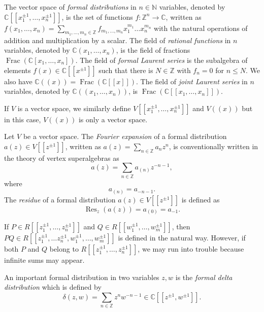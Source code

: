 \documentclass[a4paper, 12pt, reqno]{amsart}
\theoremstyle{remark}
\numberwithin{equation}{subsection}
\DeclareMathOperator{\Frac}{Frac}
\DeclareMathOperator{\Res}{Res}
\begin{document}
The vector space of \emph{formal distributions} in $n \in \mathbb{N}$ variables, denoted by $\mathbb{C}[[x_1^{\pm 1}, \dots, x_n^{\pm 1}]]$, is the set of functions $f: \mathbb{Z}^n \to \mathbb{C}$, written as $f(x_1, \dots, x_n) = \sum_{m_1, \dots, m_n \in \mathbb{Z}}f_{m_1, \dots, m_n}x_1^{m_1}\dots x_n^{m_n}$ with the natural operations of addition and multiplication by a scalar.
The field of \emph{rational functions} in $n$ variables, denoted by $\mathbb{C}(x_1, \dots, x_n)$, is the field of fractions $\Frac(\mathbb{C}[x_1, \dots, x_n])$.
The field of \emph{formal Laurent series} is the subalgebra of elements $f(x) \in \mathbb{C}[[x^{\pm 1}]]$ such that there is $N \in \mathbb{Z}$ with $f_n = 0$ for $n \le N$.
We also have $\mathbb{C}((x)) = \Frac(\mathbb{C}[[x]])$.
The field of \emph{joint Laurent series} in $n$ variables, denoted by $\mathbb{C}((x_1, \dots, x_n))$, is $\Frac(\mathbb{C}[[x_1, \dots, x_n]])$.

If $V$ is a vector space, we similarly define $V[[x_1^{\pm 1}, \dots, x_n^{\pm 1}]]$ and $V((x))$ but in this case, $V((x))$ is only a vector space.

Let $V$ be a vector space.
The \emph{Fourier expansion} of a formal distribution $a(z) \in V[[z^{\pm 1}]]$, written as $a(z) = \sum_{n \in \mathbb{Z}} a_nz^n$, is conventionally written in the theory of vertex superalgebras as
\begin{equation*}
  a(z) = \sum_{n \in \mathbb{Z}}a_{(n)}z^{-n - 1},
\end{equation*}
where
\begin{equation*}
  a_{(n)} = a_{-n - 1}.
\end{equation*}
The \emph{residue} of a formal distribution $a(z) \in V[[z^{\pm 1}]]$ is defined as
\begin{equation*}
  \Res_z(a(z)) = a_{(0)} = a_{-1}.
\end{equation*}

If $P \in R[[z_1^{\pm 1}, \dots, z_n^{\pm 1}]]$ and $Q \in R[[w_1^{\pm 1}, \dots, w_m^{\pm 1}]]$, then $PQ \in R[[z_1^{\pm 1}, \dots z_n^{\pm 1}, w_1^{\pm 1}, \dots, w_m^{\pm 1}]]$ is defined in the natural way.
However, if both $P$ and $Q$ belong to $R[[z_1^{\pm 1}, \dots, z_n^{\pm 1}]]$, we may run into trouble because infinite sums may appear.

An important formal distribution in two variables $z, w$ is the \emph{formal delta distribution} which is defined by
\begin{equation*}
  \delta(z, w) = \sum_{n \in \mathbb{Z}}z^nw^{-n - 1} \in \mathbb{C}[[z^{\pm 1}, w^{\pm 1}]].
\end{equation*}
\end{document}
